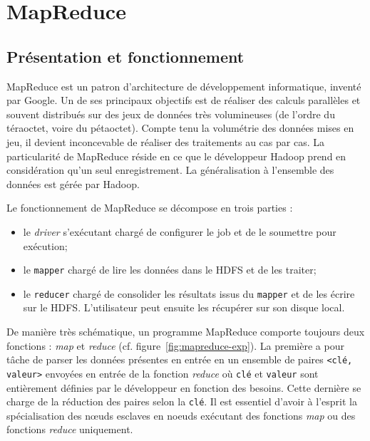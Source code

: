 \section{MapReduce}
\subsection{Présentation et fonctionnement}

\par MapReduce est un patron d'architecture de développement informatique, inventé par Google. Un de ses principaux objectifs est de réaliser des calculs parallèles et souvent distribués sur des jeux de données très volumineuses (de l'ordre du téraoctet, voire du pétaoctet). Compte tenu la volumétrie des données mises en jeu, il devient inconcevable de réaliser des traitements au cas par cas. La particularité de MapReduce réside en ce que le développeur Hadoop prend en considération qu'un seul enregistrement. La généralisation à l'ensemble des données est gérée par Hadoop.

\par Le fonctionnement de MapReduce se décompose en trois parties :
\begin{itemize}
\item le \emph{driver} s'exécutant chargé de configurer le job et de le soumettre pour exécution;
\item le \texttt{mapper} chargé de lire les données dans le HDFS et de les traiter;
\item le \texttt{reducer} chargé de consolider les résultats issus du \texttt{mapper} et de les écrire sur le HDFS. L'utilisateur peut ensuite les récupérer sur son disque local.
\end{itemize}

\par De manière très schématique, un programme MapReduce comporte toujours deux fonctions : \emph{map} et \emph{reduce} (cf. figure~\ref{fig:mapreduce-exp}). La première a pour tâche de parser les données présentes en entrée en un ensemble de paires \texttt{<clé, valeur>} envoyées en entrée de la fonction \emph{reduce} où \texttt{clé} et \texttt{valeur} sont entièrement définies par le développeur en fonction des besoins. Cette dernière se charge de la réduction des paires selon la \texttt{clé}. Il est essentiel d'avoir à l'esprit la spécialisation des n\oe{}uds esclaves en noeuds exécutant des fonctions \emph{map} ou des fonctions \emph{reduce} uniquement.

